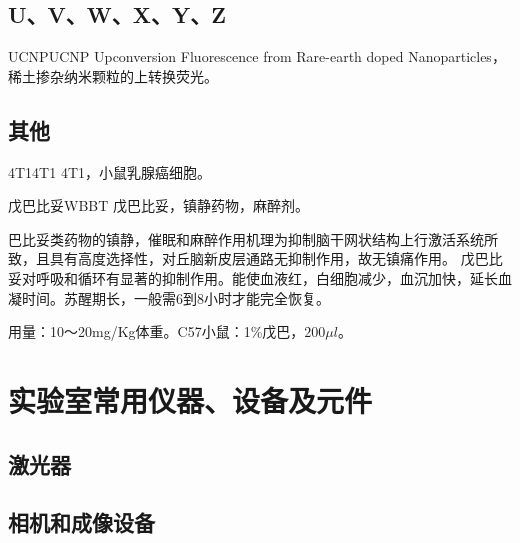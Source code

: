 \documentclass[cn,11pt,chinese]{elegantbook}
\begin{document}
\section{U、V、W、X、Y、Z}

\begin{theorem}{UCNP}{UCNP} 
  Upconversion Fluorescence from Rare-earth doped Nanoparticles，稀土掺杂纳米颗粒的上转换荧光。
  \end{theorem}  
\section{其他}

\begin{theorem}{4T1}{4T1} 
4T1，小鼠乳腺癌细胞。
  \end{theorem}  

  \begin{theorem}{戊巴比妥}{WBBT} 
   戊巴比妥，镇静药物，麻醉剂。

    巴比妥类药物的镇静，催眠和麻醉作用机理为抑制脑干网状结构上行激活系统所致，且具有高度选择性，对丘脑新皮层通路无抑制作用，故无镇痛作用。
    戊巴比妥对呼吸和循环有显著的抑制作用。能使血液红，白细胞减少，血沉加快，延长血凝时间。苏醒期长，一般需6到8小时才能完全恢复。

    用量：10～20mg/Kg体重。C57小鼠：1\%戊巴，$200 \mu l$。
\end{theorem}  
 
\chapter{实验室常用仪器、设备及元件}
\section{激光器}

\section{相机和成像设备}
\end{document}
